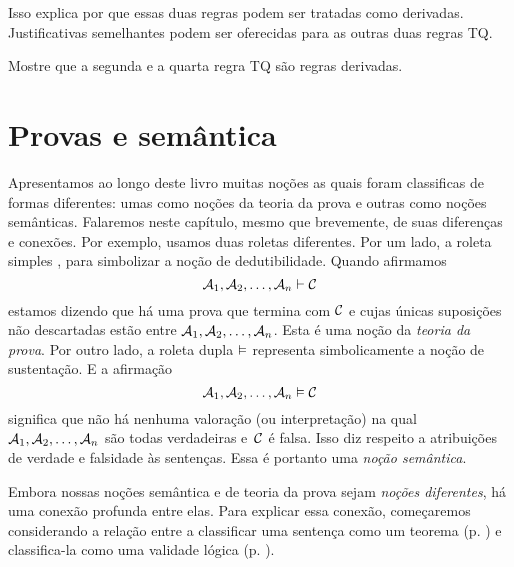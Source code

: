 \begin{fitchproof}
	\open
		\open
		\close
	\close
\end{fitchproof}
Isso explica por que essas duas regras podem ser tratadas como derivadas.  Justificativas semelhantes podem ser oferecidas para as outras duas regras TQ.

\practiceproblems

\problempart
Mostre que a segunda e a quarta regra  TQ são regras derivadas.


\chapter{Provas e semântica}

 Apresentamos ao longo deste livro muitas noções as quais foram classificas de formas diferentes: umas como noções da teoria da prova e outras como  noções semânticas.  Falaremos neste capítulo, mesmo que brevemente, de suas diferenças  e conexões. 
Por exemplo, usamos duas roletas diferentes.  Por um lado, a roleta simples  \proves,  para simbolizar a noção de dedutibilidade. Quando afirmamos 
$$\mathcal{A}_1, \mathcal{A}_2, \ldots, \mathcal{A}_n \vdash \mathcal{C}$$
estamos dizendo que há uma prova que termina com $\mathcal{C}$ e cujas únicas suposições não descartadas estão entre  $\mathcal{A}_1, \mathcal{A}_2, \ldots, \mathcal{A}_n$. Esta é uma noção da \emph{teoria da prova}.   Por outro lado,  a roleta  dupla  $\vDash$  representa simbolicamente a noção de sustentação. E a afirmação 
$$\mathcal{A}_1, \mathcal{A}_2, \ldots, \mathcal{A}_n \vDash \mathcal{C}$$
significa que não há nenhuma valoração (ou interpretação) na qual  $\mathcal{A}_1, \mathcal{A}_2, \ldots, \mathcal{A}_n$ são todas verdadeiras e~$\mathcal{C}$ é falsa. Isso diz respeito a atribuições de verdade e falsidade às sentenças. Essa é portanto uma \emph{noção semântica}.

Embora nossas noções semântica e de teoria da prova sejam \emph{noções diferentes}, há uma conexão profunda entre elas. Para explicar essa conexão, começaremos considerando a relação entre a classificar uma sentença como um teorema (p. \pageref{def:syntactic_tautology_in_sl}) e classifica-la como uma validade lógica (p. \pageref{def:validade_logica}).

